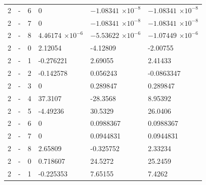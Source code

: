 \begin{longtable}
{}2 & \allowbreak{}-\allowbreak{} & 6 & 0 &  &  \\
{}2 & \allowbreak{}-\allowbreak{} & 7 & 0 &  &  \\
{}2 & \allowbreak{}-\allowbreak{} & 8 &  &  &  \\
{}2 & \allowbreak{}-\allowbreak{} & 0 & 2.12054 & -4.12809 & -2.00755 \\
{}2 & \allowbreak{}-\allowbreak{} & 1 & -0.276221 & 2.69055 & 2.41433 \\
{}2 & \allowbreak{}-\allowbreak{} & 2 & -0.142578 & 0.056243 & -0.0863347 \\
{}2 & \allowbreak{}-\allowbreak{} & 3 & 0 & 0.289847 & 0.289847 \\
{}2 & \allowbreak{}-\allowbreak{} & 4 & 37.3107 & -28.3568 & 8.95392 \\
{}2 & \allowbreak{}-\allowbreak{} & 5 & -4.49236 & 30.5329 & 26.0406 \\
{}2 & \allowbreak{}-\allowbreak{} & 6 & 0 & 0.0988367 & 0.0988367 \\
{}2 & \allowbreak{}-\allowbreak{} & 7 & 0 & 0.0944831 & 0.0944831 \\
{}2 & \allowbreak{}-\allowbreak{} & 8 & 2.65809 & -0.325752 & 2.33234 \\
{}2 & \allowbreak{}-\allowbreak{} & 0 & 0.718607 & 24.5272 & 25.2459 \\
{}2 & \allowbreak{}-\allowbreak{} & 1 & -0.225353 & 7.65155 & 7.4262 \\

\end{longtable}
